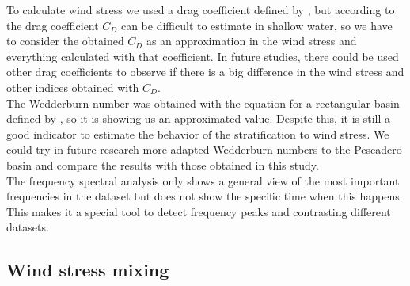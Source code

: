 \documentclass[tesis.tex]{subfiles}
\begin{document}
To calculate wind stress we used a drag coefficient defined by \cite{large1981open}, but according to \cite{paugam2021wind} the drag coefficient $C_D$ can be difficult to estimate in shallow water, so we have to consider the obtained $C_D$ as an approximation in the wind stress and everything calculated with that coefficient. In future studies, there could be used other drag coefficients to observe if there is a big difference in the wind stress and other indices obtained with $C_D$.\\

The Wedderburn number was obtained with the equation for a rectangular basin defined by \cite{Monismith1985}, so it is showing us an approximated value. Despite this, it is still a good indicator to estimate the behavior of the stratification to wind stress. We could try in future research more adapted Wedderburn numbers to the Pescadero basin and compare the results with those obtained in this study.\\

The frequency spectral analysis only shows a general view of the most important frequencies in the dataset but does not show the specific time when this happens. This makes it a special tool to detect frequency peaks and contrasting different datasets.\\

\subsection{Wind stress mixing}


\end{document}
